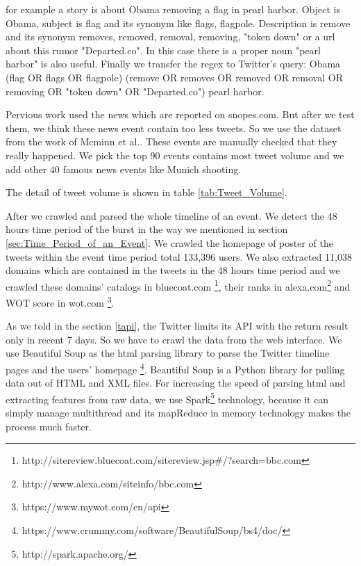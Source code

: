 for example a story is about Obama removing a flag in pearl harbor. Object is Obama, subject is flag and its synonym like flags, flagpole. Description is remove and its synonym removes, removed, removal, removing, "token down" or a url about this rumor "Departed.co". In this case there is a proper noun "pearl harbor" is also useful. Finally we transfer the regex to Twitter's query: Obama (flag OR flags OR flagpole) (remove OR removes OR removed OR removal OR removing OR "token down" OR "Departed.co") pearl harbor.


Pervious work \cite{liu2015real} used the news which are reported on snopes.com. But after we test them, we think these news event contain too less tweets. So we use the dataset from the work of Mcminn et al.\cite{mcminn2013building}. These events are manually checked that they really happened. We pick the top 90 events contains most tweet volume and we add other 40 famous news events like Munich shooting.

The detail of tweet volume is shown in table \ref{tab:Tweet_Volume}.

After we crawled and parsed the whole timeline of an event. We detect the 48 hours time period of the burst in the way we mentioned in section \ref{sec:Time_Period_of_an_Event}. We crawled the homepage of poster of the tweets within the event time period total 133,396 users. We also extracted 11,038 domains which are contained in the tweets in the 48 hours time period and we crawled these domains' catalogs in bluecoat.com \footnote{http://sitereview.bluecoat.com/sitereview.jsp\#/?search=bbc.com}, their ranks in alexa.com\footnote{http://www.alexa.com/siteinfo/bbc.com} and WOT score in wot.com \footnote{https://www.mywot.com/en/api}. 

As we told in the section \ref{tapi}, the Twitter limits its API with the return result only in recent 7 days. So we have to crawl the data from the web interface. We use Beautiful Soup as the html parsing library to parse the Twitter timeline pages and the users' homepage \footnote{https://www.crummy.com/software/BeautifulSoup/bs4/doc/}. Beautiful Soup is a Python library for pulling data out of HTML and XML files. For increasing the speed of parsing html and extracting features from raw data, we use Spark\footnote{http://spark.apache.org/} technology, because it can simply manage multithread and its mapReduce in memory technology makes the process much faster. 
 
\begin{table}[!h]
 \centering
{}
 \caption{Tweet Volume of News and Rumors}
 \label{tab:Tweet_Volume}
\end{table}
\clearpage

